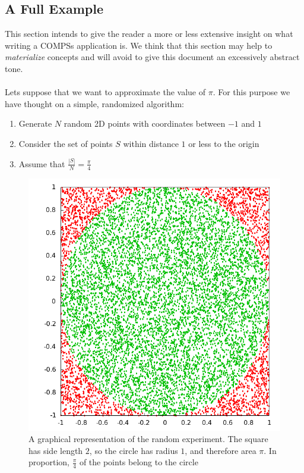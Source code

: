 \newpage
\subsection{A Full Example}
\label{subsec:compss_example}
This section intends to give the reader a more or less extensive insight on what writing a COMPSs application is. We think that this section may help to \textit{materialize} concepts and will avoid to give this document an excessively abstract tone.\\
\\
Lets suppose that we want to approximate the value of $\pi$. For this purpose we have thought on a simple, randomized algorithm:
\begin{enumerate}
\item Generate $N$ random 2D points with coordinates between $-1$ and $1$
\item Consider the set of points $S$ within distance $1$ or less to the origin
\item Assume that $\frac{|S|}{N} = \frac{\pi}{4}$
\end{enumerate}

\begin{figure}[ht!]
\centering
\includegraphics[scale=0.5]{figures/circle_square.png}
\caption{A graphical representation of the random experiment. The square has side length $2$, so the circle has radius $1$, and therefore area $\pi$. In proportion, $\frac{\pi}{4}$ of the points belong to the circle}
\label{fig:circle_square}
\end{figure}


